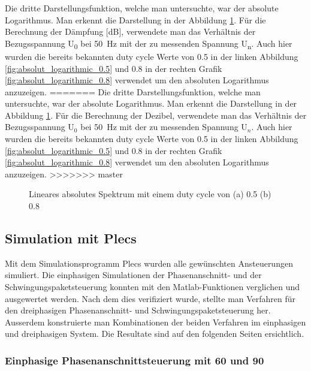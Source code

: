 Die dritte Darstellungsfunktion, welche man untersuchte, war der absolute Logarithmus. Man erkennt die Darstellung in der Abbildung \ref{fig:absolut_logaritmic_matlab}. Für die Berechnung der Dämpfung [dB], verwendete man das Verhältnis der Bezugsspannung U\textsubscript{0} bei \SI{50}{Hz} mit der zu messenden Spannung U\textsubscript{n}. Auch hier wurden die bereits bekannten duty cycle Werte von 0.5 in der linken Abbildung  \ref{fig:absolut_logarithmic_0.5} und 0.8 in der rechten Grafik \ref{fig:absolut_logarithmic_0.8} verwendet um den absoluten Logarithmus anzuzeigen.
=======
Die dritte Darstellungsfunktion, welche man untersuchte, war der absolute Logarithmus. Man erkennt die Darstellung in der Abbildung \ref{fig:absolut_logaritmic_matlab}. Für die Berechnung der Dezibel, verwendete man das Verhältnis der Bezugsspannung U$_0$ bei \SI{50}{Hz} mit der zu messenden Spannung U$_n$. Auch hier wurden die bereits bekannten duty cycle Werte von 0.5 in der linken Abbildung  \ref{fig:absolut_logarithmic_0.5} und 0.8 in der rechten Grafik \ref{fig:absolut_logarithmic_0.8} verwendet um den absoluten Logarithmus anzuzeigen.
>>>>>>> master



\begin{figure}[ht!]
	\centering
	\qquad
	\caption{Lineares absolutes Spektrum mit einem duty cycle von (a) 0.5 (b) 0.8}
	\label{fig:absolut_logaritmic_matlab}
\end{figure}
\newpage
\subsection{Simulation mit Plecs}

Mit dem Simulationsprogramm Plecs wurden alle gewünschten Ansteuerungen simuliert. Die einphasigen Simulationen der Phasenanschnitt- und der Schwingungspaketsteuerung konnten mit den Matlab-Funktionen verglichen und ausgewertet werden. Nach dem dies verifiziert wurde, stellte man Verfahren für den dreiphasigen Phasenanschnitt- und Schwingungspaketsteuerung her. Ausserdem konstruierte man Kombinationen der beiden Verfahren im einphasigen und dreiphasigen System. Die Resultate sind auf den folgenden Seiten ersichtlich. \\

\subsubsection{Einphasige Phasenanschnittsteuerung mit 60 \textdegree \hspace{0.02cm} und 90 \textdegree}

